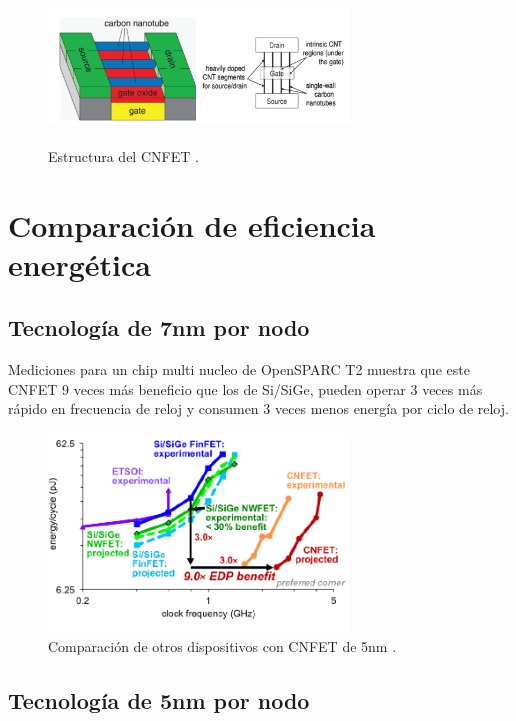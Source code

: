 \documentclass[conference]{IEEEtran} %
\begin{document}
\begin{figure}
	\centering
	\includegraphics[width=8cm,height=4cm]{IMAGENES/img13}
	\caption{Estructura del CNFET \cite{Performanceinvestigationofemerging2016}.}
	\label{img13}
\end{figure}



\section{Comparación de eficiencia energética}

\subsection{Tecnología de 7nm por nodo}

Mediciones para un chip multi nucleo de OpenSPARC T2 muestra que este CNFET 9 veces más beneficio que los de Si/SiGe, pueden operar 3 veces más rápido en frecuencia de reloj y consumen 3 veces menos energía por ciclo de reloj.

\begin{figure}
	\centering
	\includegraphics[width=8cm]{IMAGENES/img14}
	\caption{Comparación de otros dispositivos con CNFET de 5nm \cite{UnderstandingEnergyEfficiency2018} .}
	\label{img14}
\end{figure}

\subsection{Tecnología de 5nm por nodo}
\end{document}
